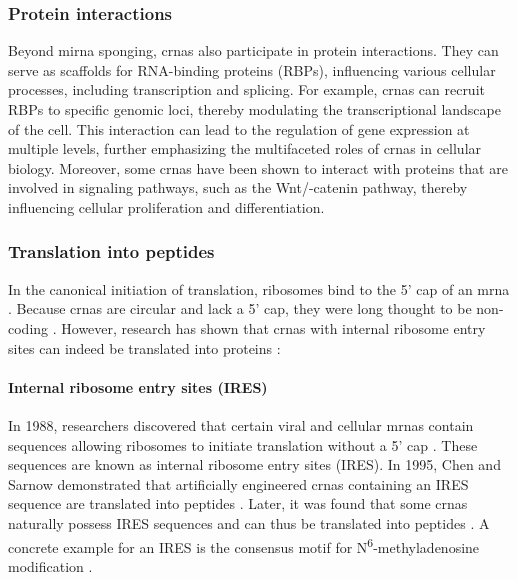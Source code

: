 \subsubsection{Protein interactions}
Beyond \gls{mirna} sponging, \gls{crna}s also participate in protein interactions.
They can serve as scaffolds for RNA-binding proteins (RBPs), influencing
various cellular processes, including transcription and
splicing\supercite{li_comprehensive_2017,qu_emerging_2017}.
For example, \gls{crna}s can recruit RBPs to specific genomic loci, thereby
modulating the transcriptional landscape of the
cell\supercite{li_comprehensive_2017}.
This interaction can lead to the regulation of gene expression at multiple
levels, further emphasizing the multifaceted roles of \gls{crna}s in cellular
biology\supercite{zhang_important_2024,he_targeting_2021}.
Moreover, some \gls{crna}s have been shown to interact with proteins that are
involved in signaling pathways, such as the Wnt/\textbeta{}-catenin pathway,
thereby influencing cellular proliferation and
differentiation\supercite{peng_novel_2021}.

\subsubsection{Translation into peptides}
In the canonical initiation of translation, ribosomes bind to the 5' cap of an
\gls{mrna} \supercite{hinnebusch_mechanism_2012}.
Because \gls{crna}s are circular and lack a 5' cap, they were long thought to
be non-coding \supercite{bao_regulatory_2019,greene_circular_2017}.
However, research has shown that \gls{crna}s with internal ribosome entry sites
can indeed be translated into proteins \supercite{chen_expanding_2020}:

\paragraph{Internal ribosome entry sites (IRES)} In 1988, researchers
discovered that certain viral and cellular \gls{mrna}s contain sequences allowing
ribosomes to initiate translation without a 5' cap
\supercite{pelletier_internal_1988, jang_segment_1988}.
These sequences are known as internal ribosome entry sites (IRES).
In 1995, Chen and Sarnow demonstrated that artificially engineered \gls{crna}s
containing an IRES sequence are translated into peptides
\supercite{chen_initiation_1995}.
Later, it was found that some \gls{crna}s naturally possess IRES sequences and
can thus be translated into peptides
\supercite{chen_expanding_2020,legnini_circ-znf609_2017,pamudurti_translation_2017}.
A concrete example for an IRES is the consensus motif for
N\textsuperscript{6}-methyladenosine modification
\supercite{yang_extensive_2017}.

